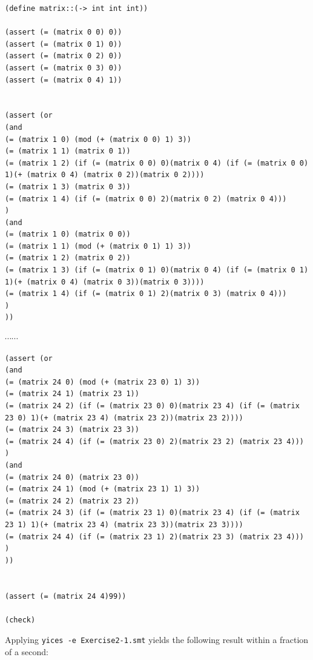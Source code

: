 \documentclass[12pt]{article}
\begin{document}
{\footnotesize
\begin{verbatim}
(define matrix::(-> int int int))

(assert (= (matrix 0 0) 0))
(assert (= (matrix 0 1) 0))
(assert (= (matrix 0 2) 0))
(assert (= (matrix 0 3) 0))
(assert (= (matrix 0 4) 1))


(assert (or
(and
(= (matrix 1 0) (mod (+ (matrix 0 0) 1) 3))
(= (matrix 1 1) (matrix 0 1))
(= (matrix 1 2) (if (= (matrix 0 0) 0)(matrix 0 4) (if (= (matrix 0 0) 1)(+ (matrix 0 4) (matrix 0 2))(matrix 0 2))))
(= (matrix 1 3) (matrix 0 3))
(= (matrix 1 4) (if (= (matrix 0 0) 2)(matrix 0 2) (matrix 0 4)))
)
(and
(= (matrix 1 0) (matrix 0 0))
(= (matrix 1 1) (mod (+ (matrix 0 1) 1) 3))
(= (matrix 1 2) (matrix 0 2))
(= (matrix 1 3) (if (= (matrix 0 1) 0)(matrix 0 4) (if (= (matrix 0 1) 1)(+ (matrix 0 4) (matrix 0 3))(matrix 0 3))))
(= (matrix 1 4) (if (= (matrix 0 1) 2)(matrix 0 3) (matrix 0 4)))
)
))

\end{verbatim}
$\cdots \cdots$
\begin{verbatim}
(assert (or
(and
(= (matrix 24 0) (mod (+ (matrix 23 0) 1) 3))
(= (matrix 24 1) (matrix 23 1))
(= (matrix 24 2) (if (= (matrix 23 0) 0)(matrix 23 4) (if (= (matrix 23 0) 1)(+ (matrix 23 4) (matrix 23 2))(matrix 23 2))))
(= (matrix 24 3) (matrix 23 3))
(= (matrix 24 4) (if (= (matrix 23 0) 2)(matrix 23 2) (matrix 23 4)))
)
(and
(= (matrix 24 0) (matrix 23 0))
(= (matrix 24 1) (mod (+ (matrix 23 1) 1) 3))
(= (matrix 24 2) (matrix 23 2))
(= (matrix 24 3) (if (= (matrix 23 1) 0)(matrix 23 4) (if (= (matrix 23 1) 1)(+ (matrix 23 4) (matrix 23 3))(matrix 23 3))))
(= (matrix 24 4) (if (= (matrix 23 1) 2)(matrix 23 3) (matrix 23 4)))
)
))


(assert (= (matrix 24 4)99))

(check)

\end{verbatim}
}

\noindent Applying {\tt yices -e Exercise2-1.smt} yields the following result
within a fraction of a second:
\end{document}
